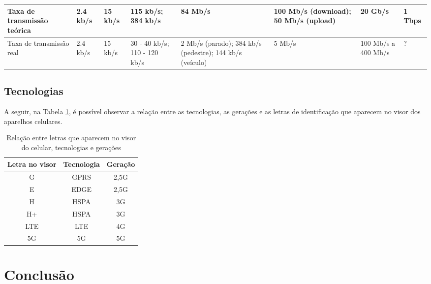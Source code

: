 \documentclass[11pt,oneside,a4paper]{abntex2}
\begin{document}
\begin{center}
\begin{longtable}{|m{1.6cm}|m{1.6cm}|m{1.6cm}|m{1.6cm}|m{1.6cm}|m{1.6cm}|m{1.6cm}|m{1.6cm}|}
Taxa de transmissão teórica & 2.4 kb/s                                                                            & 15 kb/s                     & 115 kb/s; 384 kb/s           & 84 Mb/s                                                  & 100 Mb/s (download); 50 Mb/s (upload)            & 20 Gb/s                           & 1 Tbps             \\ \hline
Taxa de transmissão real    & 2.4 kb/s                                                                            & 15 kb/s                     & 30 - 40 kb/s; 110 - 120 kb/s & 2 Mb/s (parado); 384 kb/s (pedestre); 144 kb/s (veículo) & 5 Mb/s                                           & 100 Mb/s a 400 Mb/s               & ?                  \\ \hline
\end{longtable}
\end{center}

\subsection*{Tecnologias}

A seguir, na Tabela \ref{sopa-letrinhas-2}, é possível observar a relação entre as tecnologias, as gerações e as letras de identificação que aparecem no visor dos aparelhos celulares.

\begin{table}[htb!]
\caption{Relação entre letras que aparecem no visor do celular, tecnologias e gerações}
\label{sopa-letrinhas-2}
\begin{center}
\begin{tabular}{||c||c||c||}
	\hline
	\textbf{Letra no visor} & \textbf{Tecnologia} & \textbf{Geração} \\
	\hline
	\hline
	G & GPRS & 2,5G \\
	\hline
	E & EDGE & 2,5G \\
	\hline
	H & HSPA & 3G \\
	\hline
	H+ & HSPA & 3G \\
	\hline
	LTE & LTE & 4G \\
	\hline
	5G & 5G & 5G \\
	\hline
\end{tabular}
\end{center}
\end{table}

\section*{Conclusão}
\label{conclusao}
\end{document}

